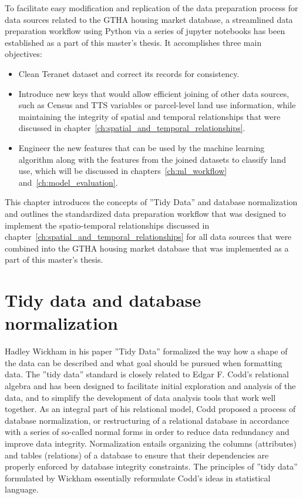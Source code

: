 To facilitate easy modification and replication of the data preparation process for data sources related to the GTHA housing market database, a streamlined data preparation workflow using Python via a series of jupyter notebooks has been established as a part of this master's thesis.
It accomplishes three main objectives:
\begin{itemize}
    \item Clean Teranet dataset and correct its records for consistency.
    \item Introduce new keys that would allow efficient joining of other data sources, such as Census and TTS variables or parcel-level land use information, while maintaining the integrity of spatial and temporal relationships that were discussed in chapter~\ref{ch:spatial_and_temporal_relationships}.
    \item Engineer the new features that can be used by the machine learning algorithm along with the features from the joined datasets to classify land use, which will be discussed in chapters~\ref{ch:ml_workflow} and~\ref{ch:model_evaluation}.
\end{itemize}

This chapter introduces the concepts of ''Tidy Data'' and database normalization and outlines the standardized data preparation workflow that was designed to implement the spatio-temporal relationships discussed in chapter~\ref{ch:spatial_and_temporal_relationships} for all data sources that were combined into the GTHA housing market database that was implemented as a part of this master's thesis.

\section{Tidy data and database normalization} \label{sec:db_norm_tidy_data}

Hadley Wickham in his paper ''Tidy Data''\cite{Wickham2014} formalized the way how a shape of the data can be described and what goal should be pursued when formatting data.
The ''tidy data'' standard is closely related to Edgar F. Codd's relational algebra and has been designed to facilitate initial exploration and analysis of the data, and to simplify the development of data analysis tools that work well together.
As an integral part of his relational model, Codd\cite{Codd1990} proposed a process of database normalization, or restructuring of a relational database in accordance with a series of so-called normal forms in order to reduce data redundancy and improve data integrity.
Normalization entails organizing the columns (attributes) and tables (relations) of a database to ensure that their dependencies are properly enforced by database integrity constraints.
The principles of ''tidy data'' formulated by Wickham essentially reformulate Codd's ideas in statistical language.

